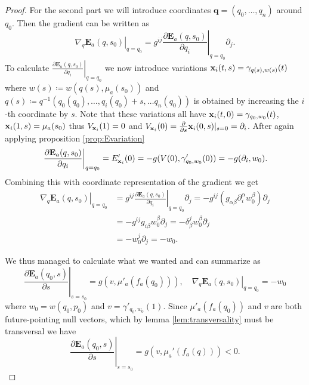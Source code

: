 \begin{proof}
    For the second part we will introduce coordinates $\mathbf{q}=(q_0,\dots,q_n)$ around $q_0$. Then the gradient can be written as
    \[
        \left.\nabla_q\mathbf{E}_a(q,s_0)\right\rvert_{q=q_0} = g^{ij}\left.\frac{\partial\mathbf{E}_a(q,s_0)}{\partial q_i}\right\rvert_{q=q_0}\partial_j.
    \]
    To calculate $\left.\frac{\partial\mathbf{E}_a(q,s_0)}{\partial q_i}\right\rvert_{q=q_0}$ we now introduce variations $\mathbf{x}_i(t,s) = \gamma_{q(s),w(s)}(t)$ where $w(s)\coloneqq w(q(s),\mu_a(s_0))$ and $q(s)\coloneqq q^{-1}(q_0(q_0),\dots, q_i(q_0)+s, \dots q_n(q_0))$ is obtained by increasing the $i$-th coordinate by $s$. Note that these variations all have $\mathbf{x}_i(t,0) = \gamma_{q_0,w_0}(t)$, $\mathbf{x}_i(1,s) = \mu_a(s_0)$ thus $V_{\mathbf{x}_i}(1)=0$ and $V_{\mathbf{x}_i}(0) = \frac{\partial}{\partial s}\mathbf{x}_i(0,s)\rvert_{s=0} = \partial_i$.
    After again applying proposition \ref{prop:Evariation}
    \[
        \left.\frac{\partial\mathbf{E}_a(q,s_0)}{\partial q_i}\right\rvert_{q=q_0} = E'_{\mathbf{x}_i}(0) =  -g(V(0),\gamma'_{q_0,w_0}(0)) = -g(\partial_i,w_0).
    \]
    Combining this with coordinate representation of the gradient we get
    \begin{align*}
        \left.\nabla_q\mathbf{E}_a(q,s_0)\right\rvert_{q=q_0} &= g^{ij}\left.\frac{\partial\mathbf{E}_a(q,s_0)}{\partial q_i}\right\rvert_{q=q_0}\partial_j = -g^{ij}(g_{\alpha\beta}\partial_i^\alpha w_0^\beta)\partial_j\\
        &= -g^{ij}g_{i\beta}w_0^\beta\partial_j = -\delta^j_\beta w_0^\beta \partial_j\\
        &= -w_0^j\partial_j = -w_0.
    \end{align*}
    
    We thus managed to calculate what we wanted and can summarize as
    \begin{equation}\label{eq:dEsummary}
        \left.\frac{\partial\mathbf{E}_a(q_0,s)}{\partial s}\right\rvert_{s=s_0} = g(v,\mu'_a(f_a(q_0))), \quad \left.\nabla_q\mathbf{E}_a(q,s_0)\right\rvert_{q=q_0}=-w_0
    \end{equation}
    where $w_0=w(q_0,p_0)$ and $v=\gamma'_{q_0,w_0}(1)$. Since $\mu'_a(f_a(q_0))$ and $v$ are both future-pointing null vectors, which by lemma \ref{lem:transversality} must be transversal we have 
    \[\left.\frac{\partial\mathbf{E}_a(q_0,s)}{\partial s}\right\rvert_{s=s_0}=g(v,\mu_a'(f_a(q)))<0.\]


\end{proof}
